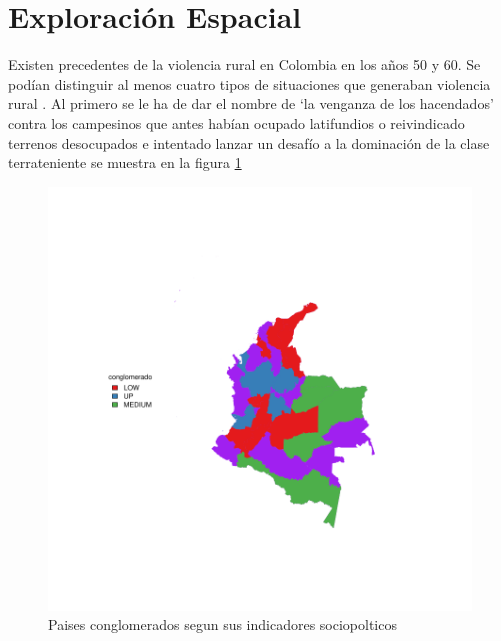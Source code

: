 \documentclass{article}
\begin{document}
\section{Exploración Espacial}

Existen precedentes de la violencia rural en Colombia en los años 50 y 60. Se podían distinguir al menos cuatro tipos de situaciones que generaban violencia rural \cite{macqueen_methods_nodate} . Al primero se le ha de dar el nombre de ‘la venganza de los hacendados’ contra los campesinos que antes habían ocupado latifundios o reivindicado terrenos desocupados e intentado lanzar un desafío a la dominación de la clase terrateniente se muestra en la figura \ref{clustmap}






\begin{figure}[h]
\centering
\includegraphics{proyecto1-plotMap1}
\caption{Paises conglomerados segun sus indicadores sociopolticos}\label{clustmap}
\end{figure}
\end{document}

